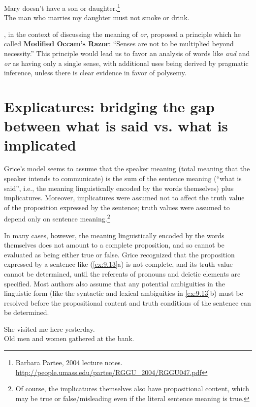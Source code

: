 \largerpage 
\ea \label{ex:9.12}
\ea Mary doesn’t have a son or daughter.\footnote{Barbara Partee, 2004 lecture notes. \url{http://people.umass.edu/partee/RGGU_2004/RGGU047.pdf}} \\
\ex The man who marries my daughter must not smoke or drink.
                       \z
\z


\citet[47]{Grice1978}, in the context of discussing the meaning of \textit{or}, proposed a principle which he called \textbf{Modified Occam’s Razor}: “Senses are not to be multiplied beyond necessity.” This principle would lead us to favor an analysis of words like \textit{and} and \textit{or} as having only a single sense, with additional uses being derived by pragmatic inference, unless there is clear evidence in favor of polysemy.


\section{Explicatures: bridging the gap between what is said vs. what is implicated}\label{sec:9.3}

Grice’s model seems to assume that the speaker meaning (total meaning that the speaker intends to communicate) is the sum of the sentence meaning (“what is said”, i.e., the meaning linguistically encoded by the words themselves) plus implicatures. Moreover, implicatures were assumed not to affect the truth value of the proposition expressed by the sentence; truth values were assumed to depend only on sentence meaning.\footnote{Of course, the implicatures themselves also have propositional content, which may be true or false/misleading even if the literal sentence meaning is true.}



In many cases, however, the meaning linguistically encoded by the words themselves does not amount to a complete proposition, and so cannot be evaluated as being either true or false. Grice recognized that the proposition expressed by a sentence like (\ref{ex:9.13}a) is not complete, and its truth value cannot be determined, until the referents of pronouns and deictic elements are specified. Most authors also assume that any potential ambiguities in the linguistic form (like the syntactic and lexical ambiguities in \ref{ex:9.13}b) must be resolved before the propositional content and truth conditions of the sentence can be determined.


\ea \label{ex:9.13}
\ea She visited me here yesterday.\\
\ex Old men and women gathered at the bank.
                       \z
\z


